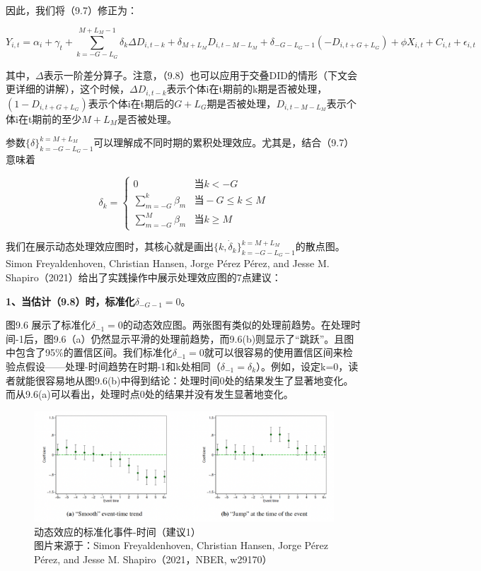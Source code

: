 \documentclass[cn,12pt,math=newtx,citestyle=gb7714-2015,bibstyle=gb7714-2015]{elegantbook}
\begin{document}
	因此，我们将（9.7）修正为：
	
		\begin{equation}
		Y_{i,t} = \alpha_i + \gamma_t + \sum_{k= -G-L_G}^{M+L_M-1} \delta_k \Delta D_{i,t-k} + \delta_{M+L_M}D_{i,t-M-L_M} + \delta_{-G-L_G-1}(-D_{i,t+G+L_G}) + \phi X_{i,t} + C_{i,t} + \epsilon_{i,t}
	\end{equation}
	
	其中，$\Delta$表示一阶差分算子。注意，（9.8）也可以应用于交叠DID的情形（下文会更详细的讲解），这个时候，$\Delta D_{i,t-k}$表示个体i在t期前的k期是否被处理，$(1-D_{i,t+G+L_G})$表示个体i在t期后的$G+L_G$期是否被处理，$D_{i,t-M-L_M}$表示个体i在t期前的至少$M+L_M$是否被处理。
	
	参数$\{\delta\}_{k=-G-L_G-1}^{k=M+L_M}$可以理解成不同时期的累积处理效应。尤其是，结合（9.7）意味着
	
\begin{equation}
\delta_k =	\begin{cases}
		 0  & \text{当} k< -G \\
		\sum_{m=-G}^{k}\beta_m    &\text{当}-G \le k \le M \\
		\sum_{m=-G}^{M}\beta_m  & \text{当} k \ge M 
	\end{cases}
\end{equation}
		
我们在展示动态处理效应图时，其核心就是画出$\{k,\dot{\delta}_k\}_{k=-G-L_G-1}^{k=M+L_M}$的散点图。Simon Freyaldenhoven, Christian Hansen, Jorge Pérez Pérez, and Jesse M. Shapiro（2021）给出了实践操作中展示处理效应图的7点建议：

\textbf{1、当估计（9.8）时，标准化$\delta_{-G-1}=0$}。

图9.6 展示了标准化$\delta_{-1}=0$的动态效应图。两张图有类似的处理前趋势。在处理时间-1后，图9.6（a）仍然显示平滑的处理前趋势，而9.6(b)则显示了“跳跃”。且图中包含了95\%的置信区间。我们标准化$\delta_{-1}=0$就可以很容易的使用置信区间来检验点假设——处理-时间趋势在时期-1和k处相同（$\delta_{-1}=\delta_k$）。例如，设定k=0，读者就能很容易地从图9.6(b)中得到结论：处理时间0处的结果发生了显著地变化。而从9.6(a)可以看出，处理时点0处的结果并没有发生显著地变化。

\begin{figure}[tbph]
	\centering
	\includegraphics[width=1\linewidth]{sug1}
	\caption{动态效应的标准化事件-时间（建议1）\\ 图片来源于：Simon Freyaldenhoven, Christian Hansen, Jorge Pérez Pérez, and Jesse M. Shapiro（2021，NBER, w29170）}
	\label{fig:sug1}
\end{figure}
\end{document}
